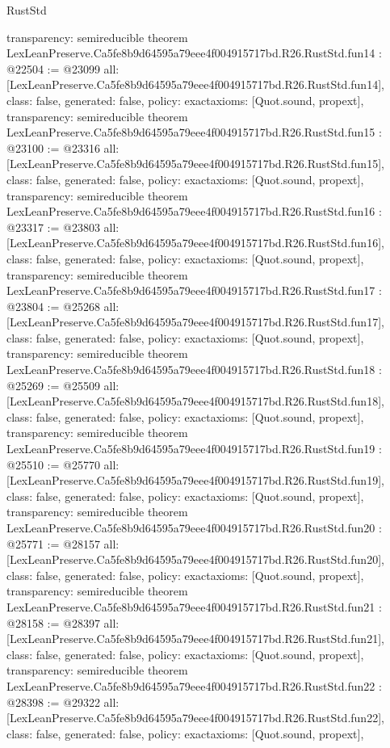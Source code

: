 \begin{lexlean}{RustStd}
\begin{coremodule}
{  transparency: semireducible
}
theorem LexLeanPreserve.Ca5fe8b9d64595a79eee4f004915717bd.R26.RustStd.fun14 : @22504 := @23099 {
  all: [LexLeanPreserve.Ca5fe8b9d64595a79eee4f004915717bd.R26.RustStd.fun14],
  class: false,
  generated: false,
  policy: exact{axioms: [Quot.sound, propext]},
  transparency: semireducible
}
theorem LexLeanPreserve.Ca5fe8b9d64595a79eee4f004915717bd.R26.RustStd.fun15 : @23100 := @23316 {
  all: [LexLeanPreserve.Ca5fe8b9d64595a79eee4f004915717bd.R26.RustStd.fun15],
  class: false,
  generated: false,
  policy: exact{axioms: [Quot.sound, propext]},
  transparency: semireducible
}
theorem LexLeanPreserve.Ca5fe8b9d64595a79eee4f004915717bd.R26.RustStd.fun16 : @23317 := @23803 {
  all: [LexLeanPreserve.Ca5fe8b9d64595a79eee4f004915717bd.R26.RustStd.fun16],
  class: false,
  generated: false,
  policy: exact{axioms: [Quot.sound, propext]},
  transparency: semireducible
}
theorem LexLeanPreserve.Ca5fe8b9d64595a79eee4f004915717bd.R26.RustStd.fun17 : @23804 := @25268 {
  all: [LexLeanPreserve.Ca5fe8b9d64595a79eee4f004915717bd.R26.RustStd.fun17],
  class: false,
  generated: false,
  policy: exact{axioms: [Quot.sound, propext]},
  transparency: semireducible
}
theorem LexLeanPreserve.Ca5fe8b9d64595a79eee4f004915717bd.R26.RustStd.fun18 : @25269 := @25509 {
  all: [LexLeanPreserve.Ca5fe8b9d64595a79eee4f004915717bd.R26.RustStd.fun18],
  class: false,
  generated: false,
  policy: exact{axioms: [Quot.sound, propext]},
  transparency: semireducible
}
theorem LexLeanPreserve.Ca5fe8b9d64595a79eee4f004915717bd.R26.RustStd.fun19 : @25510 := @25770 {
  all: [LexLeanPreserve.Ca5fe8b9d64595a79eee4f004915717bd.R26.RustStd.fun19],
  class: false,
  generated: false,
  policy: exact{axioms: [Quot.sound, propext]},
  transparency: semireducible
}
theorem LexLeanPreserve.Ca5fe8b9d64595a79eee4f004915717bd.R26.RustStd.fun20 : @25771 := @28157 {
  all: [LexLeanPreserve.Ca5fe8b9d64595a79eee4f004915717bd.R26.RustStd.fun20],
  class: false,
  generated: false,
  policy: exact{axioms: [Quot.sound, propext]},
  transparency: semireducible
}
theorem LexLeanPreserve.Ca5fe8b9d64595a79eee4f004915717bd.R26.RustStd.fun21 : @28158 := @28397 {
  all: [LexLeanPreserve.Ca5fe8b9d64595a79eee4f004915717bd.R26.RustStd.fun21],
  class: false,
  generated: false,
  policy: exact{axioms: [Quot.sound, propext]},
  transparency: semireducible
}
theorem LexLeanPreserve.Ca5fe8b9d64595a79eee4f004915717bd.R26.RustStd.fun22 : @28398 := @29322 {
  all: [LexLeanPreserve.Ca5fe8b9d64595a79eee4f004915717bd.R26.RustStd.fun22],
  class: false,
  generated: false,
  policy: exact{axioms: [Quot.sound, propext]},
}
\end{coremodule}
\end{lexlean}
